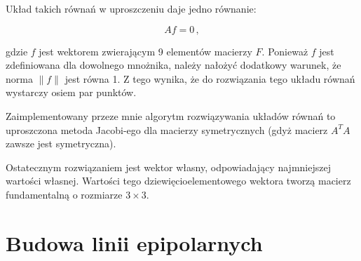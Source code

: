 Układ takich równań w uproszczeniu daje jedno równanie: 

\begin{equation} Af=0\,, \end{equation}

gdzie $f$ jest wektorem zwierającym 9 elementów macierzy $F$. Ponieważ $f$ jest
zdefiniowana dla dowolnego mnożnika, należy nałożyć dodatkowy warunek, że norma
$\|f\|$ jest równa 1. Z tego wynika, że do rozwiązania tego układu równań
wystarczy osiem par punktów.

Zaimplementowany przeze mnie algorytm rozwiązywania układów równań to
uproszczona metoda Jacobi-ego dla macierzy symetrycznych (gdyż macierz $A^TA$
zawsze jest symetryczna).

Ostatecznym rozwiązaniem jest wektor własny, odpowiadający najmniejszej
wartości własnej.  Wartości tego dziewięcioelementowego wektora tworzą macierz
fundamentalną o rozmiarze $3 \times 3$.

\section{Budowa linii epipolarnych}

